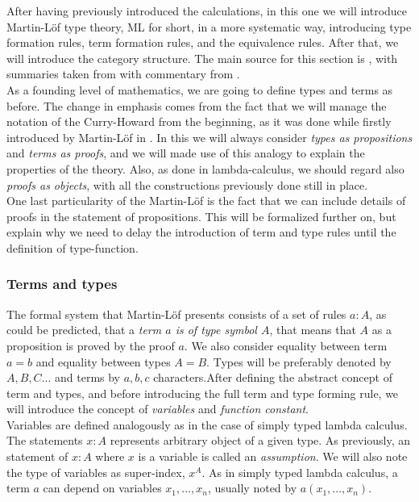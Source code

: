 After having previously introduced the calculations, in this one we will introduce Martin-L\"of type theory, ML for short, in a more systematic way, introducing type formation rules, term formation rules, and the equivalence rules. After that, we will introduce the category structure. The main source for this section is \cite{martinlof1973intuitionistic}, with summaries taken from \cite{seely1984locally} with commentary from .\\

As a founding level of mathematics, we are going to define types and terms as before. The change in emphasis comes from the fact that we will manage the notation of the Curry-Howard from the beginning, as it was done while firstly introduced by Martin-L\"of in \cite{martinlof1973intuitionistic}. In this we will always consider \emph{types as propositions} and \emph{terms as proofs}, and we will made use of this analogy to explain the properties of the theory. Also, as done in lambda-calculus, we should regard also \emph{proofs as objects}, with all the constructions previously done still in place.\\

One last particularity of the Martin-L\"of is the fact that we can include details of proofs in the statement of propositions. This will be formalized further on, but explain why we need to delay the introduction of term and type rules until the definition of type-function.

\subsubsection{Terms and types}

The formal system that Martin-L\"of presents consists of a set of rules $a : A$, as could be predicted, that a \emph{term $a$ is of type symbol $A$}, that means that $A$ as a proposition is proved by the proof $a$. We also consider equality between term $a = b$ and equality between types $A = B$. Types will be preferably denoted by $A,B,C...$ and terms by $a,b,c$ characters.After defining the abstract concept of term and types, and before introducing the full term and type forming rule, we will introduce the concept of \emph{variables} and \emph{function constant}.\\

Variables are defined analogously as in the case of simply typed lambda calculus. The statements $x: A$ represents arbitrary object of a given type. As previously, an statement of $x: A$ where $x$ is a variable is called an \emph{assumption}. We will also note the type of variables as super-index, $x^A$. As in simply typed lambda calculus, a term $a$ can depend on variables $x_1,...,x_n$, usually noted by $a(x_1,...,x_n)$.\\

